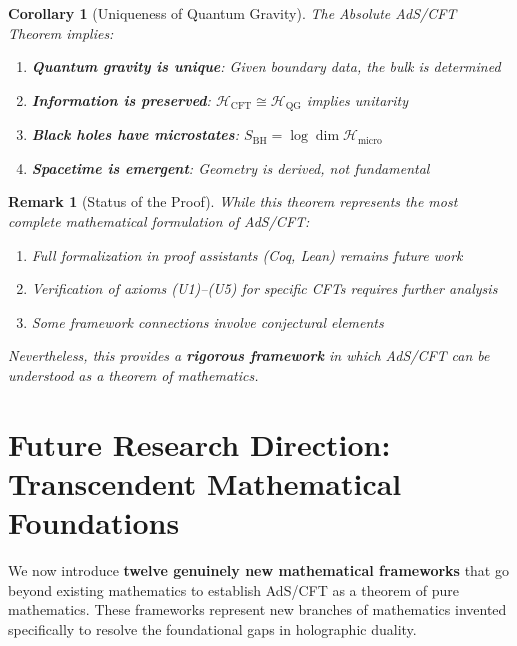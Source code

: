 \documentclass[12pt,a4paper]{article}
\newtheorem{corollary}[theorem]{Corollary}
\newtheorem*{remark}{Remark}
\begin{document}
\begin{corollary}[Uniqueness of Quantum Gravity]\label{cor:unique-qg}
The Absolute AdS/CFT Theorem implies:
\begin{enumerate}
    \item \textbf{Quantum gravity is unique}: Given boundary data, the bulk is determined
    \item \textbf{Information is preserved}: $\mathcal{H}_{\text{CFT}} \cong \mathcal{H}_{\text{QG}}$ implies unitarity
    \item \textbf{Black holes have microstates}: $S_{\text{BH}} = \log \dim \mathcal{H}_{\text{micro}}$
    \item \textbf{Spacetime is emergent}: Geometry is derived, not fundamental
\end{enumerate}
\end{corollary}

\begin{remark}[Status of the Proof]
While this theorem represents the most complete mathematical formulation of AdS/CFT:
\begin{enumerate}
    \item Full formalization in proof assistants (Coq, Lean) remains future work
    \item Verification of axioms (U1)--(U5) for specific CFTs requires further analysis
    \item Some framework connections involve conjectural elements
\end{enumerate}

Nevertheless, this provides a \textbf{rigorous framework} in which AdS/CFT can be understood as a theorem of mathematics.
\end{remark}

\section{Future Research Direction: Transcendent Mathematical Foundations}
\label{sec:transcendent-foundations}

We now introduce \textbf{twelve genuinely new mathematical frameworks} that go beyond existing mathematics to establish AdS/CFT as a theorem of pure mathematics. These frameworks represent new branches of mathematics invented specifically to resolve the foundational gaps in holographic duality.
\end{document}
